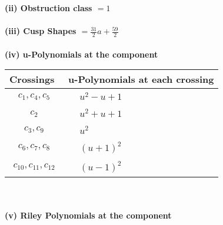\documentclass[1p]{elsarticle_modified}
\theoremstyle{definition}
\begin{document}
\flushleft \textbf{(ii) Obstruction class $= 1$}\\~\\
\flushleft \textbf{(iii) Cusp Shapes $= \frac{31}{2} a+\frac{59}{2}$}\\~\\
\newpage\renewcommand{\arraystretch}{1}
\flushleft \textbf{(iv) u-Polynomials at the component}\newline \\
\begin{tabular}{m{50pt}|m{274pt}}
Crossings & \hspace{64pt}u-Polynomials at each crossing \\
\hline $$\begin{aligned}c_{1},c_{4},c_{5}\end{aligned}$$&$\begin{aligned}
&u^2- u+1
\end{aligned}$\\
\hline $$\begin{aligned}c_{2}\end{aligned}$$&$\begin{aligned}
&u^2+u+1
\end{aligned}$\\
\hline $$\begin{aligned}c_{3},c_{9}\end{aligned}$$&$\begin{aligned}
&u^2
\end{aligned}$\\
\hline $$\begin{aligned}c_{6},c_{7},c_{8}\end{aligned}$$&$\begin{aligned}
&(u+1)^2
\end{aligned}$\\
\hline $$\begin{aligned}c_{10},c_{11},c_{12}\end{aligned}$$&$\begin{aligned}
&(u-1)^2
\end{aligned}$\\
\hline
\end{tabular}\\~\\
\newpage\renewcommand{\arraystretch}{1}
\flushleft \textbf{(v) Riley Polynomials at the component}\newline \\
\end{document}
